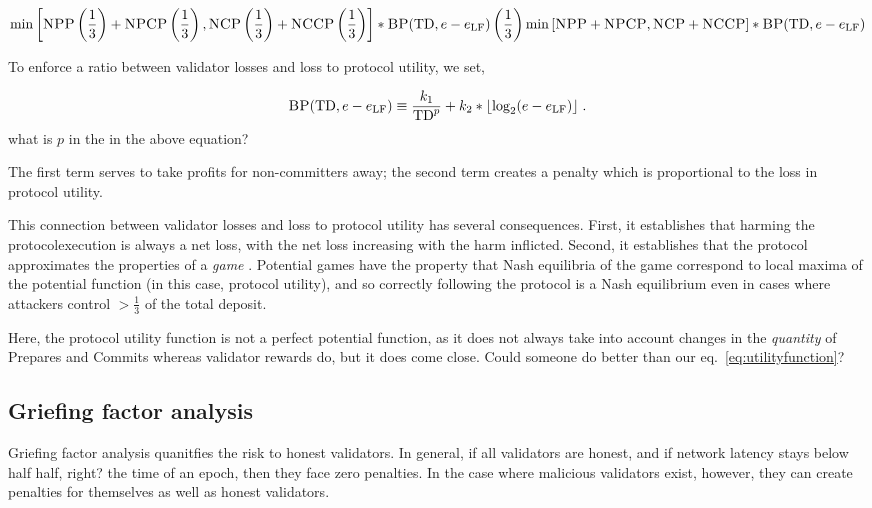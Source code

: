 \documentclass[12pt, final]{article}
\newcommand*{\todo}[1]{\color{red} #1}
\newcommand{\eqref}[1]{eq.~\ref{#1}}
\newcommand{\epoch}{\ensuremath{e}\space}
\newcommand{\totaldeposit}{\textnormal{TD}\space}
\newcommand{\epochLF}{\ensuremath{\epoch_{\textnormal{LF}}}\space}
\newcommand{\BP}{\textsc{BP}\space}
\newcommand{\NCP}{\textsc{NCP}\space}
\newcommand{\NCCP}{\textsc{NCCP}\space}
\newcommand{\NPP}{\textsc{NPP}\space}
\newcommand{\NPCP}{\textsc{NPCP}\space}
\begin{document}
\begin{equation}
\min \left[ \NPP \left(\frac{1}{3}\right) + \NPCP\left(\frac{1}{3}\right), \NCP \left(\frac{1}{3}\right) + \NCCP\left(\frac{1}{3}\right) \right] * \BP(\totaldeposit, \epoch - \epochLF) \\
\left(\frac{1}{3}\right) \min \left[ \NPP + \NPCP, \NCP + \NCCP \right] * \BP(\totaldeposit, \epoch - \epochLF) \\
\end{equation}

To enforce a ratio between validator losses and loss to protocol utility, we set,

\begin{equation}
\BP(\totaldeposit, \epoch - \epochLF) \equiv \frac{k_1}{\totaldeposit^p} + k_2 * \lfloor \log_2(\epoch - \epochLF) \rfloor\; .
\end{equation}
\todo{what is $p$ in the in the above equation?}

The first term serves to take profits for non-committers away; the second term creates a penalty which is proportional to the loss in protocol utility.

This connection between validator losses and loss to protocol utility has several consequences. First, it establishes that harming the protocolexecution is always a net loss, with the net loss increasing with the harm inflicted. Second, it establishes that the protocol approximates the properties of a \emph{game} \cite{monderer1996potential}. Potential games have the property that Nash equilibria of the game correspond to local maxima of the potential function (in this case, protocol utility), and so correctly following the protocol is a Nash equilibrium even in cases where attackers control $>\frac{1}{3}$ of the total deposit.

Here, the protocol utility function is not a perfect potential function, as it does not always take into account changes in the \emph{quantity} of Prepares and Commits whereas validator rewards do, but it does come close. \todo{Could someone do better than our \eqref{eq:utilityfunction}?}

\subsection{Griefing factor analysis}
\label{sect:griefingfactor}
Griefing factor analysis quanitfies the risk to honest validators. In general, if all validators are honest, and if network latency stays below half \todo{half, right?} the time of an epoch, then they face zero penalties.  In the case where malicious validators exist, however, they can create penalties for themselves as well as honest validators.
\end{document}
